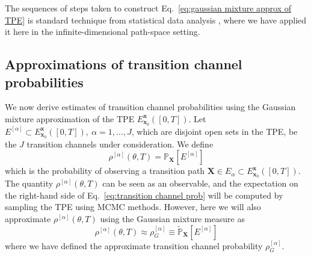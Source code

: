 The sequences of steps taken to construct Eq.~\ref{eq:gaussian mixture approx of TPE} is standard technique from statistical data analysis \citep{gelmanBayesianDataAnalysis, scottMultivariateDensityEstimation2015, goodfellowDeepLearning2016, nguyenApproximationFiniteMixtures2020, perpinanModefindingMixturesGaussian2000}, where we have applied it here in the infinite-dimensional path-space setting.

\subsection{Approximations of transition channel probabilities} \label{sec:Approximations of transition channel probabilities}

We now derive estimates of transition channel probabilities using the Gaussian mixture approximation of the TPE $E_{\mathbf{x}_0}^{\mathbf{x}}([0,T])$. Let $E^{[\alpha]} \subset E_{\mathbf{x}_0}^{\mathbf{x}}([0,T]),\ \alpha=1,\dots,J$,
which are disjoint open sets in the TPE, be the $J$ transition channels
under consideration. We define
\begin{equation} \label{eq:transition channel prob}
	\rho^{[\alpha]}(\theta,T)=\mathbb{P}_\mathbf{X}[E^{[\alpha]}]
\end{equation}
which is the probability of observing a transition path $\mathbf{X} \in E_{\alpha} \subset E_{\mathbf{x}_0}^{\mathbf{x}}([0,T])$. The quantity $\rho^{[\alpha]}(\theta,T)$ can be seen as an observable, and the expectation on the right-hand side of Eq.~\ref{eq:transition channel prob} will be computed by sampling the TPE using MCMC methods. However, here we will also approximate $\rho^{[\alpha]}(\theta,T)$ using the Gaussian mixture measure as
\begin{equation} \label{eq:transition channel prob}
	\rho^{[\alpha]}(\theta,T) \approx \rho_G^{[\alpha]} \equiv \tilde{\mathbb{P}}_\mathbf{X}[E^{[\alpha]}]
\end{equation}
where we have defined the approximate transition channel probability $\rho_G^{[\alpha]}$.


